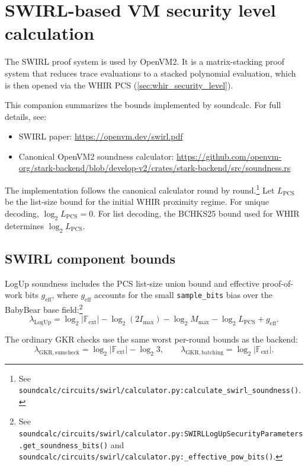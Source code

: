 \newpage
\section{SWIRL-based VM security level calculation}\label{sec:swirl_security_level}

The SWIRL proof system is used by OpenVM2. It is a matrix-stacking proof system
that reduces trace evaluations to a stacked polynomial evaluation, which is then
opened via the WHIR PCS (\cref{sec:whir_security_level}).

This companion summarizes the bounds implemented by soundcalc. For full details, see:
\begin{itemize}
    \item SWIRL paper: \url{https://openvm.dev/swirl.pdf}
    \item Canonical OpenVM2 soundness calculator:
          \url{https://github.com/openvm-org/stark-backend/blob/develop-v2/crates/stark-backend/src/soundness.rs}
\end{itemize}

The implementation follows the canonical calculator round by round.\footnote{See
\texttt{soundcalc/circuits/swirl/calculator.py:calculate\_swirl\_soundness()}.}
Let \(L_{\mathrm{PCS}}\) be the list-size bound for the initial WHIR proximity
regime. For unique decoding, \(\log_2 L_{\mathrm{PCS}}=0\). For list decoding,
the BCHKS25 bound used for WHIR determines \(\log_2 L_{\mathrm{PCS}}\).

\subsection{SWIRL component bounds}

LogUp soundness includes the PCS list-size union bound and effective proof-of-work
bits \(g_{\mathrm{eff}}\), where \(g_{\mathrm{eff}}\) accounts for the small
\texttt{sample\_bits} bias over the BabyBear base field:\footnote{See
\texttt{soundcalc/circuits/swirl/calculator.py:SWIRLLogUpSecurityParameters.get\_soundness\_bits()}
and \texttt{soundcalc/circuits/swirl/calculator.py:\_effective\_pow\_bits()}.}
\[
\lambda_{\mathrm{LogUp}}
= \log_2 |\mathbb{F}_{\mathrm{ext}}|
  - \log_2(2 I_{\max})
  - \log_2 M_{\max}
  - \log_2 L_{\mathrm{PCS}}
  + g_{\mathrm{eff}}.
\]

The ordinary GKR checks use the same worst per-round bounds as the backend:
\[
\lambda_{\mathrm{GKR,sumcheck}} =
\log_2 |\mathbb{F}_{\mathrm{ext}}| - \log_2 3,
\qquad
\lambda_{\mathrm{GKR,batching}} =
\log_2 |\mathbb{F}_{\mathrm{ext}}|.
\]

